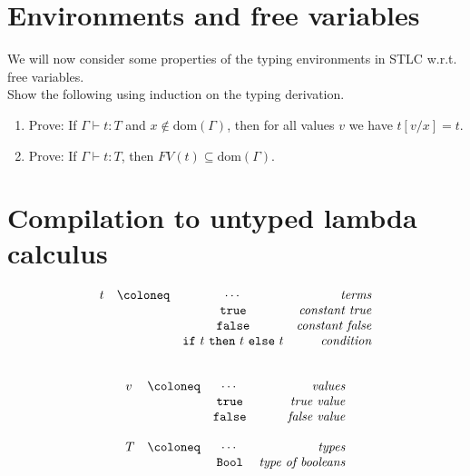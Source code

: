 \section{Environments and free variables}
We will now consider some properties of the typing environments in STLC w.r.t. free variables.\\
Show the following using induction on the typing derivation.
\begin{enumerate}
  \item Prove: If $\Gamma \vdash t : T$ and $x \notin \mathrm{dom}(\Gamma)$, then for all values $v$ we have $t[v/x] = t$.
  \item Prove: If $\Gamma \vdash t : T$, then $FV(t) \subseteq \mathrm{dom}(\Gamma)$.
\end{enumerate}

\section{Compilation to untyped lambda calculus}

\begin{minipage}{0.45\textwidth}
  \[
    \begin{array}{lccr}
      t &\coloneq & \cdots &\emph{terms} \\
      & &\mathtt{true} & \emph{constant true} \\
      & & \mathtt{false} & \emph{constant false} \\
      & & \mathtt{if}~t~\mathtt{then}~t~\mathtt{else}~t & \emph{condition} \\
    \end{array}
  \]
\end{minipage}
\hfill
\begin{minipage}{0.45\textwidth}
  \[
    \begin{array}{lccr}
      \\
      v &\coloneq&  \cdots &\emph{values} \\
      && \mathtt{true} & \emph{true value} \\
      &&\mathtt{false} & \emph{false value} \\
      \\
      T &\coloneq&  \cdots &\emph{types} \\
      & &  \mathtt{Bool} & \emph{type of booleans}
    \end{array}
  \]
\end{minipage}
\hfill
\vspace{2em}

